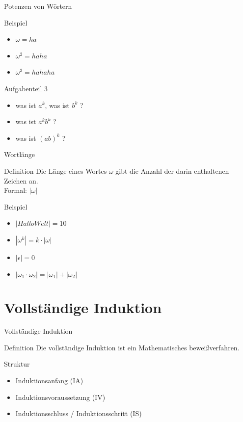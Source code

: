\documentclass[18pt]{beamer}
\begin{document}
	
	\begin{frame} {Potenzen von W\"ortern}
		\begin{exampleblock} {Beispiel}
			\begin{itemize}
				\item $\omega = ha$
				\item $\omega^2 = haha$
				\item $\omega^3 = hahaha$
			\end{itemize}
		\end{exampleblock}
	\end{frame}
	
	
	\begin{frame} {Aufgabenteil 3}
		\begin{itemize}
			\item was ist $a^k$, was ist $b^k$ ?
			\pause
			\item was ist $a^kb^k$ ?
			\pause
			\item was ist $(ab)^k$ ?
		\end{itemize}
	\end{frame}
	
	
	\begin{frame} {Wortl\"ange}
		\begin{block} {Definition}
			Die L\"ange eines Wortes $\omega$ gibt die Anzahl der darin enthaltenen Zeichen an. \\
			Formal: $|\omega|$
		\end{block}
		
		\begin{exampleblock} {Beispiel}
			\begin{itemize}
				\item $|Hallo Welt| = 10$
				\pause
				\item $|\omega^k| = k \cdot |\omega|$
				\pause
				\item $|\epsilon| = 0$
				\pause
				\item $|\omega_1 \cdot \omega_2| = |\omega_1| + |\omega_2|$
			\end{itemize}
		\end{exampleblock}
	\end{frame}
	
	
	\section{Vollst\"andige Induktion}
	\begin{frame} {Vollst\"andige Induktion}
		\begin{block} {Definition}
			Die vollst\"andige Induktion ist ein Mathematisches bewei\ss{}verfahren.\\
		\end{block}
		
		\begin{exampleblock} {Struktur}
			\begin{itemize}
				\item Induktionsanfang (IA)
				\item Induktionsvoraussetzung (IV)
				\item Induktionsschluss / Induktionsschritt (IS)
			\end{itemize}
		\end{exampleblock}
	\end{frame}
	
\end{document}
